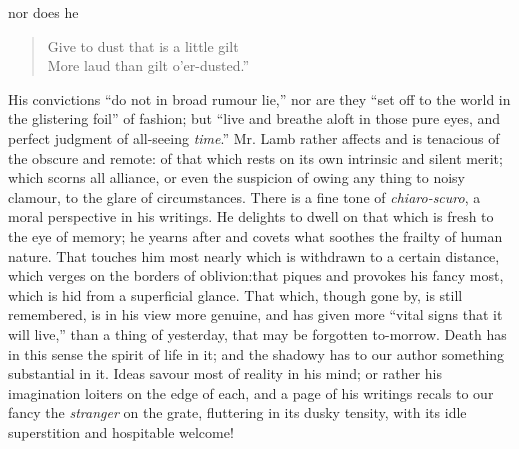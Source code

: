 nor does he
\begin{verse}
  Give to dust that is a little gilt \\
  More laud than gilt o'er-dusted.''
\end{verse}
His convictions ``do not in broad rumour lie,'' nor are they ``set
off to the world in the glistering foil'' of fashion; but ``live
and breathe aloft in those pure eyes, and perfect judgment of
all-seeing \emph{time}.''  Mr. Lamb rather affects and is
tenacious of the obscure and remote: of that which rests on its
own intrinsic and silent merit; which scorns all alliance, or even
the suspicion of owing any thing to noisy clamour, to the glare of
circumstances. There is a fine tone of \emph{chiaro-scuro}, a
moral perspective in his writings. He delights to dwell on that
which is fresh to the eye of memory; he yearns after and covets
what soothes the frailty of human nature. That touches him most
nearly which is withdrawn to a certain distance, which verges on
the borders of oblivion:\textemdash that piques and provokes his
fancy most, which is hid from a superficial glance. That which,
though gone by, is still remembered, is in his view more genuine,
and has given more ``vital signs that it will live,'' than a thing
of yesterday, that may be forgotten to-morrow. Death has in this
sense the spirit of life in it; and the shadowy has to our author
something substantial in it. Ideas savour most of reality in his
mind; or rather his imagination loiters on the edge of each, and a
page of his writings recals to our fancy the \emph{stranger} on
the grate, fluttering in its dusky tensity, with its idle
superstition and hospitable welcome!

